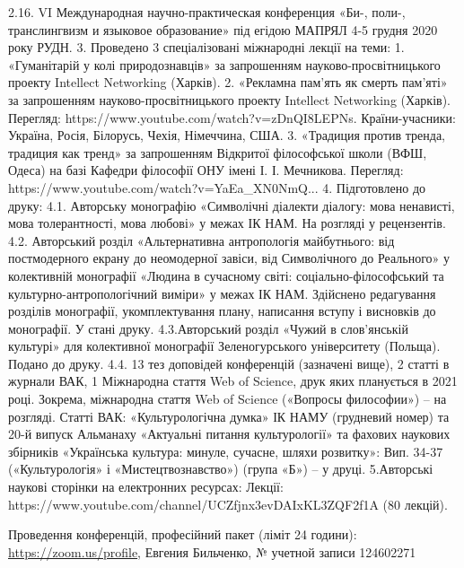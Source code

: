 2.16. VI Международная научно-практическая конференция «Би-, поли-, транслингвизм и языковое образование» під егідою МАПРЯЛ 4-5 грудня 2020 року РУДН.  
3. Проведено 3 спеціалізовані міжнародні лекції на теми:
1. «Гуманітарій у колі природознавців» за запрошенням науково-просвітницького проекту Intellect Networking (Харків).
2. «Рекламна пам’ять як смерть пам’яті» за запрошенням науково-просвітницького проекту Intellect Networking (Харків). Перегляд: https://www.youtube.com/watch?v=zDnQI8LEPNs. Країни-учасники: Україна, Росія, Білорусь, Чехія, Німеччина, США.
3. «Традиция против тренда, традиция как тренд» за запрошенням Відкритої філософської школи (ВФШ, Одеса) на базі Кафедри філософії ОНУ імені І. І. Мечникова. Перегляд: https://www.youtube.com/watch?v=YaEa_XN0NmQ...
4. Підготовлено до друку:
4.1. Авторську монографію «Символічні діалекти діалогу: мова ненависті, мова толерантності, мова любові» у межах ІК НАМ. На розгляді у рецензентів. 
4.2. Авторський розділ «Альтернативна антропологія майбутнього: від постмодерного екрану до неомодерної завіси, від Символічного до Реального» у колективній монографії «Людина в сучасному світі: соціально-філософський та культурно-антропологічний виміри» у межах ІК НАМ. Здійснено редагування розділів монографії, укомплектування плану, написання вступу і висновків до монографії. У стані друку.
4.3.Авторський розділ «Чужий в слов’янській культурі» для колективної монографії Зеленогурського університету (Польща). Подано до друку.
4.4. 13 тез доповідей конференцій (зазначені вище), 2 статті в журнали ВАК, 1 Міжнародна стаття Web of Science, друк яких планується в 2021 році.  Зокрема, міжнародна стаття Web of Science («Вопросы философии») – на розгляді. Статті ВАК: «Культурологічна думка» ІК НАМУ (грудневий номер) та 20-й випуск Альманаху «Актуальні питання культурології» та фахових наукових збірників «Українська культура: минуле, сучасне, шляхи розвитку»: Вип. 34-37 («Культурологія» і «Мистецтвознавство») (група «Б») – у друці.
5.Авторські наукові сторінки на електронних ресурсах: 
Лекції: https://www.youtube.com/channel/UCZfjnx3evDAIxKL3ZQF2f1A
(80 лекцій). 

Проведення конференцій, професійний пакет (ліміт 24 години):
\url{https://zoom.us/profile}, Евгения Бильченко, № учетной записи 124602271

